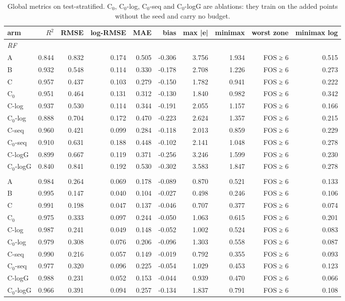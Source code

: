\begin{table}[htbp]
\centering
\small
\setlength{\tabcolsep}{4pt}
\caption{Global metrics on test-stratified. C$_0$, C$_0$-log, C$_0$-seq and C$_0$-logG are ablations: they train on the added points without the seed and carry no budget.}
\label{tab:test-stratified__log-rmse:global}
\begin{tabular}{lrrrrrrrrr}
\toprule
arm & $R^2$ & RMSE & log-RMSE & MAE & bias & max |e| & minimax & worst zone & minimax log \\
\midrule
\multicolumn{10}{l}{\textit{RF}} \\
A & 0.844 & 0.832 & 0.174 & 0.505 & -0.306 & 3.756 & 1.934 & FOS ≥ 6 & 0.515 \\
B & 0.932 & 0.548 & 0.114 & 0.330 & -0.178 & 2.708 & 1.226 & FOS ≥ 6 & 0.273 \\
C & 0.957 & 0.437 & 0.103 & 0.279 & -0.150 & 1.782 & 0.941 & FOS ≥ 6 & 0.222 \\
C$_0$ & 0.951 & 0.464 & 0.131 & 0.312 & -0.130 & 1.840 & 0.982 & FOS ≥ 6 & 0.342 \\
C-log & 0.937 & 0.530 & 0.114 & 0.344 & -0.191 & 2.055 & 1.157 & FOS ≥ 6 & 0.166 \\
C$_0$-log & 0.888 & 0.704 & 0.172 & 0.470 & -0.223 & 2.624 & 1.357 & FOS ≥ 6 & 0.215 \\
C-seq & 0.960 & 0.421 & 0.099 & 0.284 & -0.118 & 2.013 & 0.859 & FOS ≥ 6 & 0.229 \\
C$_0$-seq & 0.910 & 0.631 & 0.188 & 0.448 & -0.102 & 2.141 & 1.048 & FOS ≥ 6 & 0.278 \\
C-logG & 0.899 & 0.667 & 0.119 & 0.371 & -0.256 & 3.246 & 1.599 & FOS ≥ 6 & 0.230 \\
C$_0$-logG & 0.840 & 0.841 & 0.192 & 0.530 & -0.302 & 3.583 & 1.847 & FOS ≥ 6 & 0.278 \\
\addlinespace
\multicolumn{10}{l}{\textit{GBM}} \\
A & 0.984 & 0.264 & 0.069 & 0.178 & -0.089 & 0.870 & 0.521 & FOS ≥ 6 & 0.133 \\
B & 0.995 & 0.147 & 0.040 & 0.104 & -0.027 & 0.498 & 0.246 & FOS ≥ 6 & 0.106 \\
C & 0.991 & 0.198 & 0.047 & 0.137 & -0.046 & 0.707 & 0.377 & FOS ≥ 6 & 0.074 \\
C$_0$ & 0.975 & 0.333 & 0.097 & 0.244 & -0.050 & 1.063 & 0.615 & FOS ≥ 6 & 0.201 \\
C-log & 0.987 & 0.241 & 0.049 & 0.148 & -0.052 & 1.002 & 0.524 & FOS ≥ 6 & 0.083 \\
C$_0$-log & 0.979 & 0.308 & 0.076 & 0.206 & -0.096 & 1.303 & 0.558 & FOS ≥ 6 & 0.087 \\
C-seq & 0.990 & 0.216 & 0.057 & 0.149 & -0.019 & 0.792 & 0.355 & FOS ≥ 6 & 0.093 \\
C$_0$-seq & 0.977 & 0.320 & 0.096 & 0.225 & -0.054 & 1.029 & 0.453 & FOS ≥ 6 & 0.123 \\
C-logG & 0.988 & 0.231 & 0.052 & 0.153 & -0.044 & 0.939 & 0.470 & FOS ≥ 6 & 0.066 \\
C$_0$-logG & 0.966 & 0.391 & 0.094 & 0.257 & -0.134 & 1.837 & 0.791 & FOS ≥ 6 & 0.108 \\
\bottomrule
\end{tabular}
\end{table}
